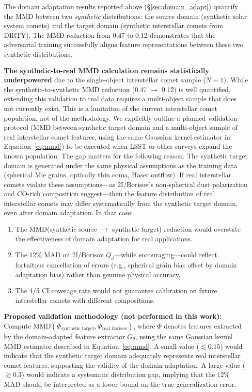 \documentclass[usenatbib]{mnras}
\begin{document}
The domain adaptation results reported above (\S\ref{sec:domain_adapt}) quantify the MMD between two \textit{synthetic} distributions: the source domain (synthetic solar system comets) and the target domain (synthetic interstellar comets from DIRTY). The MMD reduction from 0.47 to 0.12 demonstrates that the adversarial training successfully aligns feature representations between these two synthetic distributions.

\textbf{The synthetic-to-real MMD calculation remains statistically underpowered} due to the single-object interstellar comet sample ($N=1$). While the synthetic-to-synthetic MMD reduction (0.47 $\to$ 0.12) is well quantified, extending this validation to real data requires a multi-object sample that does not currently exist. This is a limitation of the current interstellar comet population, not of the methodology. We explicitly outline a planned validation protocol (MMD between synthetic target domain and a multi-object sample of real interstellar comet features, using the same Gaussian kernel estimator in Equation~\ref{eq:mmd}) to be executed when LSST or other surveys expand the known population. The gap matters for the following reason. The synthetic target domain is generated under the same physical assumptions as the training data (spherical Mie grains, optically thin coma, Haser outflow). If real interstellar comets violate these assumptions---as 2I/Borisov's non-spherical dust polarization \citep{bagnulo21} and CO-rich composition \citep{bodewits20} suggest---then the feature distribution of real interstellar comets may differ systematically from the synthetic target domain, even after domain adaptation. In that case:

\begin{enumerate}
    \item The MMD(synthetic source $\to$ synthetic target) reduction would overstate the effectiveness of domain adaptation for real applications.
    \item The 12\% MAD on 2I/Borisov $Q_d$---while encouraging---could reflect fortuitous cancellation of errors (e.g., spherical grain bias offset by domain adaptation bias) rather than genuine physical accuracy.
    \item The 4/5 CI coverage rate would not guarantee calibration on future interstellar comets with different compositions.
\end{enumerate}

\textbf{Proposed validation methodology (not performed in this work):} Compute $\text{MMD}(\Phi_{\text{synthetic target}}, \Phi_{\text{real Borisov}})$, where $\Phi$ denotes features extracted by the domain-adapted feature extractor $G_\theta$, using the same Gaussian kernel MMD estimator described in Equation~\ref{eq:mmd}. A small value ($\lesssim 0.15$) would indicate that the synthetic target domain adequately represents real interstellar comet features, supporting the validity of the domain adaptation. A large value ($\gtrsim 0.3$) would indicate a systematic distribution gap, implying that the 12\% MAD should be interpreted as a lower bound on the true generalization error.
\end{document}
